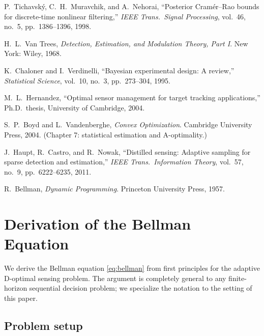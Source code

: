 \documentclass[11pt,a4paper]{article}
\begin{document}
\begin{enumerate}[label={[\arabic*]}]
  \item P.~Tichavsk\'y, C.~H.~Muravchik, and A.~Nehorai, ``Posterior Cram\'er--Rao bounds for discrete-time nonlinear filtering,'' \emph{IEEE Trans.\ Signal Processing}, vol.~46, no.~5, pp.~1386--1396, 1998.

  \item H.~L.~Van Trees, \emph{Detection, Estimation, and Modulation Theory, Part I}.  New York: Wiley, 1968.

  \item K.~Chaloner and I.~Verdinelli, ``Bayesian experimental design: A review,'' \emph{Statistical Science}, vol.~10, no.~3, pp.~273--304, 1995.

  \item M.~L.~Hernandez, ``Optimal sensor management for target tracking applications,'' Ph.D.\ thesis, University of Cambridge, 2004.

  \item S.~P.~Boyd and L.~Vandenberghe, \emph{Convex Optimization}.  Cambridge University Press, 2004.  (Chapter 7: statistical estimation and A-optimality.)

  \item J.~Haupt, R.~Castro, and R.~Nowak, ``Distilled sensing: Adaptive sampling for sparse detection and estimation,'' \emph{IEEE Trans.\ Information Theory}, vol.~57, no.~9, pp.~6222--6235, 2011.

  \item R.~Bellman, \emph{Dynamic Programming}.  Princeton University Press, 1957.
\end{enumerate}

\appendix

\section{Derivation of the Bellman Equation}
\label{app:bellman}

We derive the Bellman equation \eqref{eq:bellman} from first principles for the adaptive D-optimal sensing problem.  The argument is completely general to any finite-horizon sequential decision problem; we specialize the notation to the setting of this paper.

\subsection{Problem setup}
\end{document}
